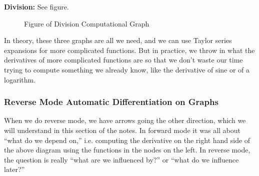 \textbf{Division:} See figure.
\begin{figure}[ht]
\begin{center}
    \caption{Figure of Division Computational Graph}
\end{center}
\end{figure}

In theory, these three graphs are all we need, and we can use Taylor series expansions for more complicated functions. But in practice, we throw in what the derivatives of more complicated functions are so that we don't waste our time trying to compute something we already know, like the derivative of sine or of a logarithm. 


\newpage
\subsubsection{Reverse Mode Automatic Differentiation on Graphs}

When we do reverse mode, we have arrows going the other direction, which we will understand in this section of the notes. In forward mode it was all about ``what do we depend on,'' i.e. computing the derivative on the right hand side of the above diagram using the functions in the nodes on the left. In reverse mode, the question is really ``what are we influenced by?'' or ``what do we influence later?''

